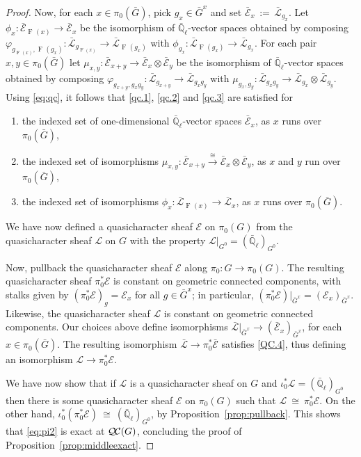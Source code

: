 \documentclass[11pt]{amsart}
\theoremstyle{plain}
\theoremstyle{definition}
\theoremstyle{remark}
\newcommand{\EE}{\mathbb{\bar Q}_\ell}
\newcommand{\Frob}[1]{\operatorname{F}_{#1}}
\newcommand{\ceq}{{\, :=\, }}
\newcommand{\iso}{{\ \cong\ }}
\newcommand{\qcs}[1]{{\mathcal{#1}}}
\newcommand{\gqcs}[1]{{\mathcal{\bar #1}}}
\newcommand{\QC}{{\mathcal{Q\hskip-0.8pt C}}}
\newcommand{\bG}{\bar{G}}
\begin{document}
\begin{proof}
Now, for each $x\in \pi_0(\bG)$, pick $g_x\in \bG^x$ 
and set $\gqcs{E}_x \ceq \gqcs{L}_{g_x}$. 
Let $\phi_x : \gqcs{E}_{\Frob{}(x)} \to \gqcs{E}_x$ 
be the isomorphism of $\EE$-vector spaces obtained by composing 
$\varphi_{g_{\Frob{}(x)},\Frob{}(g_x)} : \gqcs{L}_{g_{\Frob{}(x)}} \to \gqcs{L}_{\Frob{}(g_x)}$ 
with $\phi_{g_x} : \gqcs{L}_{\Frob{}(g_x)} \to \gqcs{L}_{g_x}$. 
For each pair $x,y\in \pi_0(\bG)$ 
let $\mu_{x,y} : \gqcs{E}_{x+y}\to \gqcs{E}_x\otimes \gqcs{E}_y$ 
be the isomorphism of $\EE$-vector spaces obtained by composing
$\varphi_{g_{x+y},g_xg_y} : \gqcs{L}_{g_{x+y}} \to \gqcs{L}_{g_xg_y}$ 
with $\mu_{g_x,g_y} : \gqcs{L}_{g_xg_y} \to \gqcs{L}_{g_x}\otimes \gqcs{L}_{g_y}$.
Using \eqref{eq:qc}, it follows that \ref{qc.1}, \ref{qc.2} and \ref{qc.3} are satisfied for
\begin{enumerate}
\item
the indexed set of one-dimensional $\EE$-vector spaces  $\gqcs{E}_x$, 
as $x$ runs over $\pi_0(\bG)$,
\item the indexed set of isomorphisms
  $\mu_{x,y} : \gqcs{E}_{x+y} \xrightarrow{\iso} \gqcs{E}_{x} \otimes\gqcs{E}_{y}$,
 as $x$ and $y$ run over $\pi_0(\bG)$,
 \item the indexed set of isomorphisms $\phi_{x} : \gqcs{L}_{\Frob{}(x)} \to \gqcs{L}_x$,
as $x$ runs over $\pi_0(\bG)$.
\end{enumerate}
We have now defined a quasicharacter sheaf $\qcs{E}$ on $\pi_0(G)$ 
from the quasicharacter sheaf $\qcs{L}$ on $G$ 
with the property $\qcs{L}\vert_{G^0} = (\EE)_{G^0}$.

Now, pullback the quasicharacter sheaf $\qcs{E}$ along $\pi_0 : G \to \pi_0(G)$.
The resulting quasicharacter sheaf $\pi_0^* \qcs{E}$ is constant 
on geometric connected components, with stalks given by 
$(\pi_0^* \qcs{E})_g = \qcs{E}_{x}$ for all $g\in \bG^x$; 
in particular, $\left(\pi_0^* \qcs{E}\right)\vert_{\bG^x} =  (\qcs{E}_{x})_{\bG^x}$.
Likewise, the quasicharacter sheaf $\qcs{L}$ is constant 
on geometric connected components. Our choices above define isomorphisms
$\gqcs{L}\vert_{\bG^x} \to  (\gqcs{E}_{x})_{\bG^x}$, for each $x\in \pi_0(\bG)$.
The resulting isomorphism $\gqcs{L} \to \pi_0^* \gqcs{E}$ satisfies \ref{QC.4}, 
thus defining an isomorphism $\qcs{L} \to \pi_0^* \qcs{E}$.

We have now show that if $\qcs{L}$ is a quasicharacter sheaf on $G$ and $\iota_0^*\qcs{L}= (\EE)_{G^0}$ then there is some quasicharacter sheaf $\qcs{E}$ on $\pi_0(G)$ such that $\qcs{L} \iso \pi_0^* \qcs{E}$. On the other hand, $\iota_0^*(\pi_0^* \qcs{E}) \iso (\EE)_{G^0}$, by Proposition~\ref{prop:pullback}. This shows that \eqref{eq:pi2} is exact at $\QC(G)$, concluding the proof of Proposition~\ref{prop:middleexact}.
\end{proof}
\end{document}
